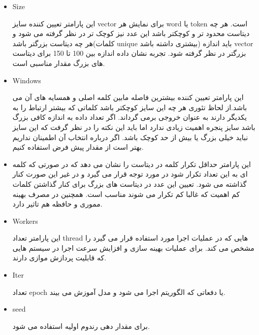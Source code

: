 \documentclass[10pt]{article}
\begin{document}
\begin{itemize}
	\item Size 
	
	این پارامتر تعیین کننده سایز vector برای نمایش هر word یا token است. هر چه دیتاست محدود تر و کوچکتر باشد این عدد نیز کوچک تر در نظر گرفته می شود و هر چه دیتاست بزرگتر باشد(کلمات unique بیشتری داشته باشد) باید اندازه vector بزرگتر در نظر گرفته شود. تجربه نشان داده اندازه بین 100 تا 150 برای دیتاست های بزرگ مقدار مناسبی است.
	
	\item Windows 
	
	این پارامتر تعیین کننده بیشترین فاصله مابین کلمه اصلی و همسایه های آن می باشد.از لحاظ تئوری هر چه این سایز کوچکتر باشد کلماتی که بیشتر ارتباط را به یکدیگر دارند به عنوان خروجی برمی گرداند. اگر تعداد داده به اندازه کافی بزرگ باشد سایز پنجره اهمیت زیادی ندارد اما باید این نکته را در نظر گرفت که این سایز نباید خیلی بزرگ یا بیش از حد کوچک باشد. اگر درباره انتخاب آن اطمینان نداریم بهتر است از مقدار پیش فرض استفاده کنیم.
	
	
	\item {}
	
	این پارامتر حداقل تکرار کلمه در دیتاست را نشان می دهد که در صورتی که کلمه ای به این تعداد تکرار شود در
	 مورد توجه قرار می گیرد و در غیر این صورت کنار گذاشته می شود. تعیین این عدد در دیتاست های بزرگ برای کنار گذاشتن کلمات کم اهمیت که غالبا کم تکرار می شوند مناسب است. همچنین در مصرف بهینه مموری و حافظه هم تاثیر دارد.
	
	 
	\item Workers
	
	این پارامتر تعداد thread هایی که در عملیات اجرا مورد استفاده قرار می گیرد را مشخص می کند. برای عملیات بهینه سازی و افزایش سرعت اجرا در سیستم هایی که قابلیت پردازش موازی دارند.
	
	 
	\item Iter
	
	تعداد epoch یا دفعاتی که الگوریتم اجرا می شود و مدل آموزش می بیند.
	 
	\item seed 
	
	برای مقدار دهی رندوم اولیه استفاده می شود.
\end{itemize}
	
\end{document}
